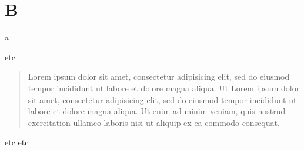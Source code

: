 \documentclass{article}
\begin{document}
\makeatletter



\makeatother                                
\section*{B}
a

  \beginnumbering
	
    \pstart
    etc
    
     \begin{quote} 
    Lorem ipsum dolor sit amet, consectetur adipisicing elit, sed do eiusmod tempor incididunt ut labore et dolore magna aliqua. Ut 
  Lorem ipsum dolor sit amet, consectetur adipisicing elit, sed do eiusmod tempor incididunt ut labore et dolore magna aliqua. Ut enim ad minim veniam, quis nostrud exercitation ullamco laboris nisi ut aliquip ex ea commodo consequat. 
    \end{quote}
   
   
   etc etc
   \pend
   \endnumbering
    
\end{document}
